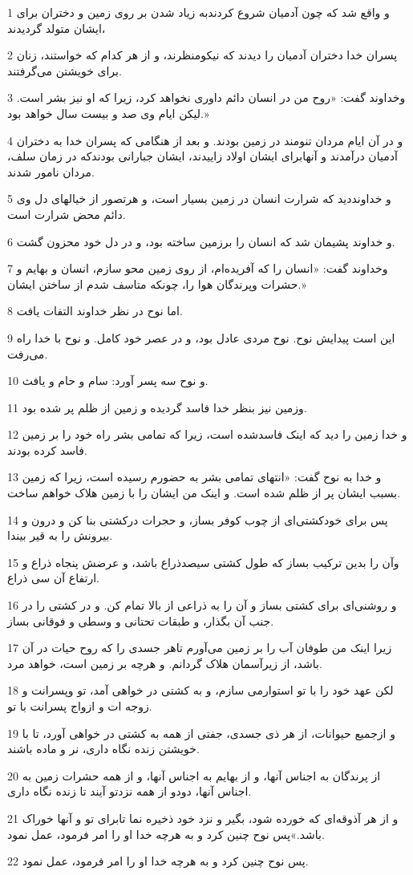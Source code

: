 \par 1 و واقع شد که چون آدمیان شروع کردندبه زیاد شدن بر روی زمین و دختران برای ایشان متولد گردیدند،
\par 2 پسران خدا دختران آدمیان را دیدند که نیکومنظرند، و از هر کدام که خواستند، زنان برای خویشتن می‌گرفتند.
\par 3 وخداوند گفت: «روح من در انسان دائم داوری نخواهد کرد، زیرا که او نیز بشر است. لیکن ایام وی صد و بیست سال خواهد بود.»
\par 4 و در آن ایام مردان تنومند در زمین بودند. و بعد از هنگامی که پسران خدا به دختران آدمیان در‌آمدند و آنهابرای ایشان اولاد زاییدند، ایشان جبارانی بودندکه در زمان سلف، مردان نامور شدند.
\par 5 و خداونددید که شرارت انسان در زمین بسیار است، و هرتصور از خیالهای دل وی دائم محض شرارت است.
\par 6 و خداوند پشیمان شد که انسان را برزمین ساخته بود، و در دل خود محزون گشت.
\par 7 وخداوند گفت: «انسان را که آفریده‌ام، از روی زمین محو سازم، انسان و بهایم و حشرات وپرندگان هوا را، چونکه متاسف شدم از ساختن ایشان.»
\par 8 اما نوح در نظر خداوند التفات یافت.
\par 9 این است پیدایش نوح. نوح مردی عادل بود، و در عصر خود کامل. و نوح با خدا راه می‌رفت.
\par 10 و نوح سه پسر آورد: سام و حام و یافث.
\par 11 وزمین نیز بنظر خدا فاسد گردیده و زمین از ظلم پر شده بود.
\par 12 و خدا زمین را دید که اینک فاسدشده است، زیرا که تمامی بشر راه خود را بر زمین فاسد کرده بودند.
\par 13 و خدا به نوح گفت: «انتهای تمامی بشر به حضورم رسیده است، زیرا که زمین بسبب ایشان پر از ظلم شده است. و اینک من ایشان را با زمین هلاک خواهم ساخت.
\par 14 پس برای خودکشتی‌ای از چوب کوفر بساز، و حجرات درکشتی بنا کن و درون و بیرونش را به قیر بیندا.
\par 15 وآن را بدین ترکیب بساز که طول کشتی سیصدذراع باشد، و عرضش پنجاه ذراع و ارتفاع آن سی ذراع.
\par 16 و روشنی‌ای برای کشتی بساز و آن را به ذراعی از بالا تمام کن. و در کشتی را در جنب آن بگذار، و طبقات تحتانی و وسطی و فوقانی بساز.
\par 17 زیرا اینک من طوفان آب را بر زمین می‌آورم تاهر جسدی را که روح حیات در آن باشد، از زیرآسمان هلاک گردانم. و هر‌چه بر زمین است، خواهد مرد.
\par 18 لکن عهد خود را با تو استوارمی سازم، و به کشتی در خواهی آمد، تو وپسرانت و زوجه ات و ازواج پسرانت با تو.
\par 19 و ازجمیع حیوانات، از هر ذی جسدی، جفتی از همه به کشتی در خواهی آورد، تا با خویشتن زنده نگاه داری، نر و ماده باشند.
\par 20 از پرندگان به اجناس آنها، و از بهایم به اجناس آنها، و از همه حشرات زمین به اجناس آنها، دودو از همه نزدتو آیند تا زنده نگاه داری.
\par 21 و از هر آذوقه‌ای که خورده شود، بگیر و نزد خود ذخیره نما تابرای تو و آنها خوراک باشد.»پس نوح چنین کرد و به هرچه خدا او را امر فرمود، عمل نمود.
\par 22 پس نوح چنین کرد و به هرچه خدا او را امر فرمود، عمل نمود.
 
